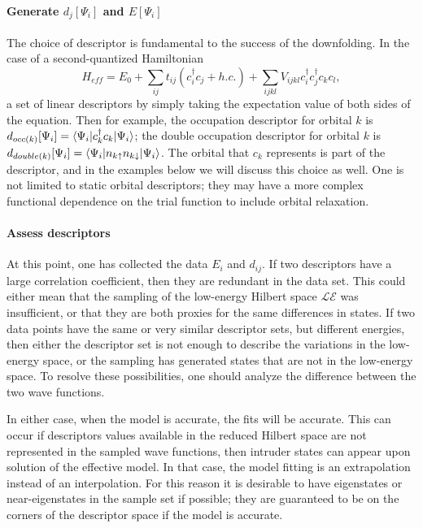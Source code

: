 \paragraph{Generate $d_j[\Psi_i]$ and $E[\Psi_i]$} 
The choice of descriptor is fundamental to the success of the downfolding. 
In the case of a second-quantized Hamiltonian
\begin{equation}
H_{eff} = E_0 + \sum_{ij} t_{ij} (c_i^\dagger c_j + h.c.) + \sum_{ijkl} V_{ijkl} c_i^\dagger c_j^\dagger c_k c_l,
\end{equation}
a set of linear descriptors by simply taking the expectation value of both sides of the equation. 
Then for example, the occupation descriptor for orbital $k$ is $d_{occ(k)}[\Psi_i] = \braket{\Psi_i | c_k^\dagger c_k | \Psi_i}$; the double occupation descriptor for orbital $k$ is $d_{double(k)}[\Psi_i] = \braket{\Psi_i | n_{k\uparrow}n_{k\downarrow} | \Psi_i}$. 
The orbital that $c_k$ represents is part of the descriptor, and in the examples below we will discuss this choice as well.
One is not limited to static orbital descriptors; they may have a more complex functional dependence on the trial function to include orbital relaxation.

 
\paragraph{Assess descriptors}
At this point, one has collected the data $E_i$ and $d_{ij}$. 
If two descriptors have a large correlation coefficient, then they are redundant in the data set. 
This could either mean that the sampling of the low-energy Hilbert space $\mathcal{LE}$ was insufficient, or that they are both proxies for the same differences in states. 
If two data points have the same or very similar descriptor sets, but different energies, then either the descriptor set is not enough to describe the variations in the low-energy space, or the sampling has generated states that are not in the low-energy space.
To resolve these possibilities, one should analyze the difference between the two wave functions.  

In either case, when the model is accurate, the fits will be accurate.
This can occur if descriptors values available in the reduced Hilbert space are not represented in the sampled wave functions, then intruder states can appear upon solution of the effective model. 
In that case, the model fitting is an extrapolation instead of an interpolation.
For this reason it is desirable to have eigenstates or near-eigenstates in the sample set if possible; they are guaranteed to be on the corners of the descriptor space if the model is accurate.



